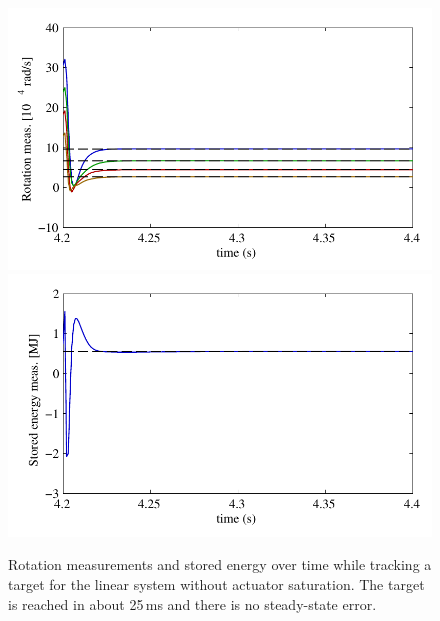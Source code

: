 \documentclass[12pt,lot, lof]{puthesis}
\begin{document}
\begin{figure}[htbp]
	\centering
	\includegraphics{chap10/fast_y_rotation}
	\includegraphics{chap10/fast_y_energy}
	\caption{Rotation measurements and stored energy over time while tracking a target for the linear system without actuator saturation.
		The target is reached in about 25\,ms and there is no steady-state error.
	}
	\label{fig:best_y}
\end{figure}
\end{document}
